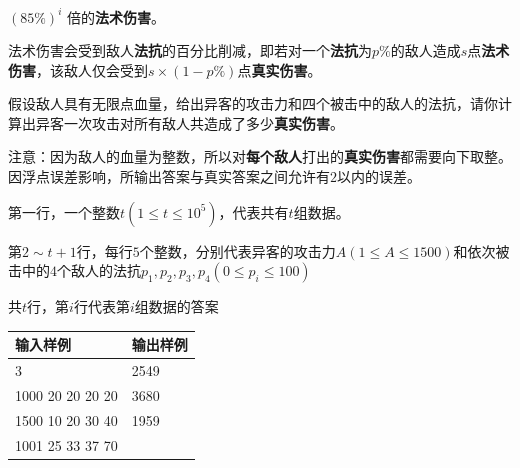 \documentclass[
    lang=cn,
    color=green
]{elegantbook}
\begin{document}
{$(85\%)^i$ 倍的\textbf{法术伤害}。

    法术伤害会受到敌人\textbf{法抗}的百分比削减，即若对一个\textbf{法抗}为$p\%$的敌人造成$s$点\textbf{法术伤害}，该敌人仅会受到$s \times (1-p\%)$点\textbf{真实伤害}。

    假设敌人具有无限点血量，给出异客的攻击力和四个被击中的敌人的法抗，请你计算出异客一次攻击对所有敌人共造成了多少\textbf{真实伤害}。

    注意：因为敌人的血量为整数，所以对\textbf{每个敌人}打出的\textbf{真实伤害}都需要向下取整。因浮点误差影响，所输出答案与真实答案之间允许有$2$以内的误差。

}{
    第一行，一个整数$t(1 \leq t \leq 10^5)$，代表共有$t$组数据。

    第$2 \sim t+1$行，每行$5$个整数，分别代表异客的攻击力$A(1 \leq A \leq 1500)$和依次被击中的$4$个敌人的法抗$p_1,p_2,p_3,p_4(0 \leq p_i \leq 100)$

}{
    共$t$行，第$i$行代表第$i$组数据的答案

}{
    \begin{tabularx}{450pt}{X|X}
        \toprule
        输入样例         & 输出样例 \\
        \midrule
        3                & 2549     \\
        1000 20 20 20 20 & 3680     \\
        1500 10 20 30 40 & 1959     \\
        1001 25 33 37 70 &          \\
        \bottomrule
    \end{tabularx}

}
\end{document}
